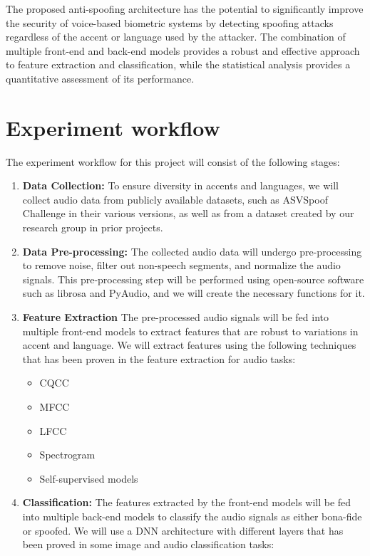 The proposed anti-spoofing architecture has the potential to significantly improve the security of voice-based biometric systems by detecting spoofing attacks regardless of the accent or language used by the attacker. The combination of multiple front-end and back-end models provides a robust and effective approach to feature extraction and classification, while the statistical analysis provides a quantitative assessment of its performance.

\section{Experiment workflow}

The experiment workflow for this project will consist of the following stages:

\begin{enumerate}
    \item \textbf{Data Collection:} To ensure diversity in accents and languages, we will collect audio data from publicly available datasets, such as ASVSpoof Challenge in their various versions, as well as from a dataset created by our research group in prior projects.
    \item \textbf{Data Pre-processing:} The collected audio data will undergo pre-processing to remove noise, filter out non-speech segments, and normalize the audio signals. This pre-processing step will be performed using open-source software such as librosa and PyAudio, and we will create the necessary functions for it.
    \item \textbf{Feature Extraction} The pre-processed audio signals will be fed into multiple front-end models to extract features that are robust to variations in accent and language. We will extract features using the following techniques that has been proven in the feature extraction for audio tasks: 
    \begin{itemize}
        \item \ac{CQCC}
        \item \ac{MFCC}
        \item \ac{LFCC}
        \item Spectrogram
        \item Self-supervised models
    \end{itemize}
    \item \textbf{Classification:} The features extracted by the front-end models will be fed into multiple back-end models to classify the audio signals as either bona-fide or spoofed. We will use a \ac{DNN} architecture with different layers that has been proved in some image and audio classification tasks:

\end{enumerate}
